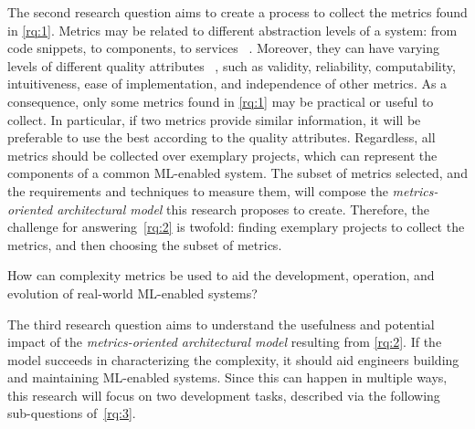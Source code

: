   The second research question aims to create a process to collect
  the metrics found in \cref{rq:1}.
  Metrics may be related to different abstraction levels of a system:
  from code snippets, to components, to services%
  ~\parencite{Fenton2014SoftwareEdition, Tu2009TheMetrics}.
  Moreover, they can have varying levels of different quality attributes%
  ~\parencite{Latva-Koivisto2001FindingModels, Polancic2017ComplexityReview},
  such as validity, reliability, computability, intuitiveness,
  ease of implementation, and independence of other metrics.
  As a consequence, only some metrics found in \cref{rq:1} may
  be practical or useful to collect. In particular, if two metrics
  provide similar information, it will be preferable to use the best
  according to the quality attributes. Regardless, all metrics should
  be collected over exemplary projects, which can represent the
  components of a common ML-enabled system. The subset of metrics
  selected, and the requirements and techniques to measure them,
  will compose the \emph{metrics-oriented architectural model}
  this research proposes to create. Therefore, the challenge
  for answering~\cref{rq:2} is twofold: finding exemplary projects
  to collect the metrics, and then choosing the subset of metrics.
  
  
  \begin{researchquestion}
    How can complexity metrics be used to aid the development,
    operation, and evolution of real-world ML-enabled systems?
  \end{researchquestion}

  The third research question aims to understand the usefulness and
  potential impact of the \emph{metrics-oriented architectural model}
  resulting from \cref{rq:2}. If the model succeeds in characterizing
  the complexity, it should aid engineers building and maintaining
  ML-enabled systems. Since this can happen in multiple ways, this
  research will focus on two development tasks, described via the
  following sub-questions of~\cref{rq:3}.
  
